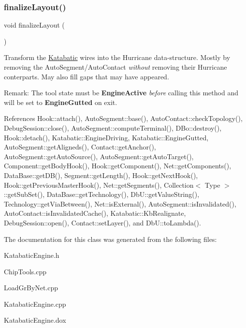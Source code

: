 \subsubsection{\texorpdfstring{finalize\+Layout()}{finalizeLayout()}}
{\footnotesize\ttfamily void finalize\+Layout (\begin{DoxyParamCaption}{ }\end{DoxyParamCaption})\hspace{0.3cm}{\ttfamily [virtual]}}

Transform the \hyperlink{namespaceKatabatic}{Katabatic} wires into the Hurricane data-\/structure. Mostly by removing the Auto\+Segment/\+Auto\+Contact {\itshape without} removing their Hurricane conterparts. May also fill gaps that may have appeared.

\begin{DoxyParagraph}{Remark\+:}
The tool state must be {\bfseries Engine\+Active} {\itshape before} calling this method and will be set to {\bfseries Engine\+Gutted} on exit. 
\end{DoxyParagraph}


References Hook\+::attach(), Auto\+Segment\+::base(), Auto\+Contact\+::check\+Topology(), Debug\+Session\+::close(), Auto\+Segment\+::compute\+Terminal(), D\+Bo\+::destroy(), Hook\+::detach(), Katabatic\+::\+Engine\+Driving, Katabatic\+::\+Engine\+Gutted, Auto\+Segment\+::get\+Aligneds(), Contact\+::get\+Anchor(), Auto\+Segment\+::get\+Auto\+Source(), Auto\+Segment\+::get\+Auto\+Target(), Component\+::get\+Body\+Hook(), Hook\+::get\+Component(), Net\+::get\+Components(), Data\+Base\+::get\+D\+B(), Segment\+::get\+Length(), Hook\+::get\+Next\+Hook(), Hook\+::get\+Previous\+Master\+Hook(), Net\+::get\+Segments(), Collection$<$ Type $>$\+::get\+Sub\+Set(), Data\+Base\+::get\+Technology(), Db\+U\+::get\+Value\+String(), Technology\+::get\+Via\+Between(), Net\+::is\+External(), Auto\+Segment\+::is\+Invalidated(), Auto\+Contact\+::is\+Invalidated\+Cache(), Katabatic\+::\+Kb\+Realignate, Debug\+Session\+::open(), Contact\+::set\+Layer(), and Db\+U\+::to\+Lambda().



The documentation for this class was generated from the following files\+:\begin{DoxyCompactItemize}
\item 
Katabatic\+Engine.\+h\item 
Chip\+Tools.\+cpp\item 
Load\+Gr\+By\+Net.\+cpp\item 
Katabatic\+Engine.\+cpp\item 
Katabatic\+Engine.\+dox\end{DoxyCompactItemize}
